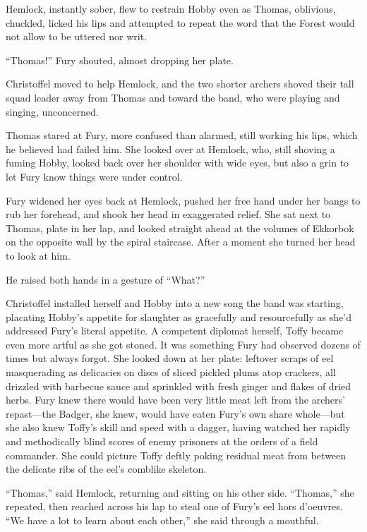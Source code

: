 \documentclass[11pt,a5paper]{article}
\begin{document}
Hemlock, instantly sober, flew to restrain Hobby even as Thomas, oblivious, chuckled, licked his lips and attempted to repeat the word that the Forest would not allow to be uttered nor writ.

``Thomas!'' Fury shouted, almost dropping her plate.

Christoffel moved to help Hemlock, and the two shorter archers shoved their tall squad leader away from Thomas and toward the band, who were playing and singing, unconcerned.

Thomas stared at Fury, more confused than alarmed, still working his lips, which he believed had failed him. She looked over at Hemlock, who, still shoving a fuming Hobby, looked back over her shoulder with wide eyes, but also a grin to let Fury know things were under control.

Fury widened her eyes back at Hemlock, pushed her free hand under her bangs to rub her forehead, and shook her head in exaggerated relief. She sat next to Thomas, plate in her lap, and looked straight ahead at the volumes of Ekkorbok on the opposite wall by the spiral staircase. After a moment she turned her head to look at him.

He raised both hands in a gesture of ``What?''

Christoffel installed herself and Hobby into a new song the band was starting, placating Hobby's appetite for slaughter as gracefully and resourcefully as she'd addressed Fury's literal appetite. A competent diplomat herself, Toffy became even more artful as she got stoned. It was something Fury had observed dozens of times but always forgot. She looked down at her plate: leftover scraps of eel masquerading as delicacies on discs of sliced pickled plums atop crackers, all drizzled with barbecue sauce and sprinkled with fresh ginger and flakes of dried herbs. Fury knew there would have been very little meat left from the archers' repast---the Badger, she knew, would have eaten Fury's own share whole---but she also knew Toffy's skill and speed with a dagger, having watched her rapidly and methodically blind scores of enemy prisoners at the orders of a field commander. She could picture Toffy deftly poking residual meat from between the delicate ribs of the eel's comblike skeleton.

``Thomas,'' said Hemlock, returning and sitting on his other side. ``Thomas,'' she repeated, then reached across his lap to steal one of Fury's eel hors d'oeuvres. ``We have a lot to learn about each other,'' she said through a mouthful.
\end{document}
